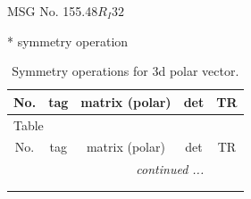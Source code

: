 \documentclass[fleqn,8pt]{jsarticle}
\begin{document}
\setcounter{MaxMatrixCols}{32}

\renewcommand{\tablename}{Table~}
\renewcommand{\figurename}{Figure~}
\begin{center}
\LARGE
MSG No. 155.48\quad$R_{I}32$
\end{center}
* symmetry operation
\renewcommand{\arraystretch}{1.3}
\begin{longtable}{ccccc}
\caption{Symmetry operations for 3d polar vector.}
 \\
 \hline \hline
No. & tag & matrix (polar) & det & TR \\ \hline \endfirsthead

\multicolumn{4}{l}{\tablename\ \thetable{}} \\
 \hline \hline
No. & tag & matrix (polar) & det & TR \\ \hline \endhead

 \hline \hline
\multicolumn{4}{r}{\footnotesize\it continued ...} \\ \endfoot

 \hline \hline
\multicolumn{4}{r}{} \\ \endlastfoot


\end{longtable}
\end{document}

